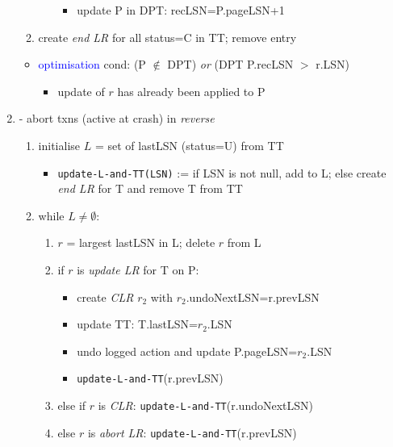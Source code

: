 \documentclass[10pt, landscape]{article}
\begin{document}
\begin{multicols*}{4}
\begin{enumerate}
\begin{enumerate}
\begin{enumerate}
              \begin{itemize}
                \item update P in DPT: recLSN=P.pageLSN+1
              \end{itemize}
          \end{enumerate}
        \item create \textit{end LR} for all status=C in TT; remove entry
      \end{enumerate}
      \begin{itemize}
        \item \textcolor{blue}{optimisation} cond: (P $\not\in$ DPT) \textit{or} (DPT P.recLSN $>$ r.LSN)
          \begin{itemize}
            \item update of $r$ has already been applied to P
          \end{itemize}
      \end{itemize}
    \item {} - abort  txns (active at crash) in \textit{reverse}
      \begin{enumerate}
        \item initialise $L$ = set of lastLSN (status=U) from TT
          \begin{itemize}
            \item \texttt{update-L-and-TT(LSN)} := if LSN is not null, add to L; else create \textit{end LR} for T and remove T from TT
          \end{itemize}
        \item while $L \neq \emptyset$:
          \begin{enumerate}
            \item $r$ = largest lastLSN in L; delete $r$ from L
            \item if $r$ is \textit{update LR} for T on P:
              \begin{itemize}
                \item create \textit{CLR} $r_2$ with $r_2$.undoNextLSN=r.prevLSN
                \item update TT: T.lastLSN=$r_2$.LSN
                \item undo logged action and update P.pageLSN=$r_2$.LSN
                \item \texttt{update-L-and-TT}(r.prevLSN)
              \end{itemize}
            \item else if $r$ is \textit{CLR}: \texttt{update-L-and-TT}(r.undoNextLSN)
            \item else $r$ is \textit{abort LR}: \texttt{update-L-and-TT}(r.prevLSN)
          \end{enumerate}
      \end{enumerate}
  \end{enumerate}


\end{multicols*}
\end{document}
